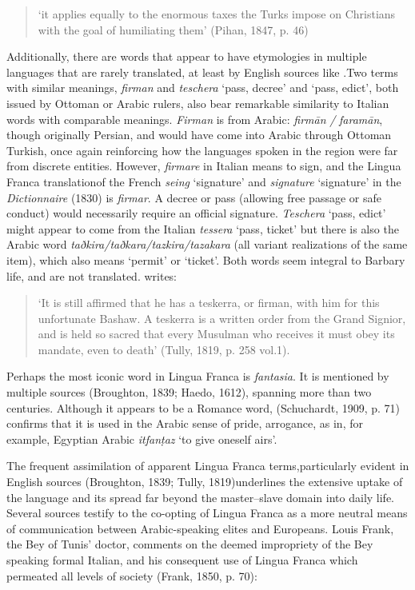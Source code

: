 \documentclass[output=paper]{langsci/langscibook}
\begin{document}
\begin{quote}
	‘it applies equally to the enormous taxes the Turks impose on Christians with the goal of humiliating them’ (Pihan, 1847, p. 46)
\end{quote}

Additionally, there are words that appear to have etymologies in multiple languages that are rarely translated, at least by English sources like \citet{Tully1819}.Two terms with similar meanings, \textit{firman} and \textit{teschera} ‘pass, decree’ and ‘pass, edict’, both issued by Ottoman or Arabic rulers, also bear remarkable similarity to Italian words with comparable meanings. \textit{Firman} is from Arabic: \textit{firmān} \textit{/} \textit{faramān}, though originally Persian, and would have come into Arabic through Ottoman Turkish, once again reinforcing how the languages spoken in the region were far from discrete entities. However, \textit{firmare} in Italian means to sign, and the Lingua Franca translationof the French \textit{seing} ‘signature’ and \textit{signature} ‘signature’ in the \textit{Dictionnaire} (1830) is \textit{firmar}. A decree or pass (allowing free passage or safe conduct) would necessarily require an official signature. \textit{Teschera} ‘pass, edict’ might appear to come from the Italian \textit{tessera} ‘pass, ticket’ but there is also the Arabic word \textit{taðkira/taðkara/tazkira/tazakara} (all variant realizations of the same item), which also means ‘permit’ or ‘ticket’. Both words seem integral to Barbary life, and are not translated. \citet{Tully1819} writes: 

\begin{quote}
	‘It is still affirmed that he has a teskerra, or firman, with him for this unfortunate Bashaw. A teskerra is a written order from the Grand Signior, and is held so sacred that every Musulman who receives it must obey its mandate, even to death’ (Tully, 1819, p. 258 vol.1).
\end{quote}

Perhaps the most iconic word in Lingua Franca is \textit{fantasia}. It is mentioned by multiple sources (Broughton, 1839; Haedo, 1612), spanning more than two centuries. Although it appears to be a Romance word, (Schuchardt, 1909, p. 71) confirms that it is used in the Arabic sense of pride, arrogance, as in, for example, Egyptian Arabic \textit{itfanṭaz} ‘to give oneself airs’.

The frequent assimilation of apparent Lingua Franca terms,particularly evident in English sources (Broughton, 1839; Tully, 1819)underlines the extensive uptake of the language and its spread far beyond the master–slave domain into daily life. Several sources testify to the co-opting of Lingua Franca as a more neutral means of communication between Arabic-speaking elites and Europeans. Louis Frank, the Bey of Tunis’ doctor, comments on the deemed impropriety of the Bey speaking formal Italian, and his consequent use of Lingua Franca which permeated all levels of society (Frank, 1850, p. 70):
\end{document}
